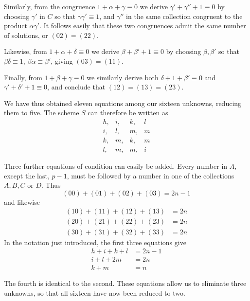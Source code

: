 Similarly, from the congruence $1+\alpha+\gamma\equiv0$ we derive $\gamma'+\gamma''+1\equiv0$ by choosing $\gamma'$ in $C$ so that $\gamma\gamma'\equiv1$, and $\gamma''$ in the same collection congruent to the product $\alpha\gamma'$. It follows easily that these two congruences admit the same number of solutions, or $(02)=(22)$.

Likewise, from $1+\alpha+\delta\equiv0$ we derive $\beta+\beta'+1\equiv0$ by choosing $\beta,\beta'$ so that $\beta\delta\equiv1$, $\beta\alpha\equiv\beta'$, giving $(03)=(11)$.

Finally, from $1+\beta+\gamma\equiv0$ we similarly derive both $\delta+1+\beta'\equiv0$ and $\gamma'+\delta'+1\equiv0$, and conclude that $(12)=(13)=(23)$.

We have thus obtained eleven equations among our sixteen unknowns, reducing them to five. The scheme $S$ can therefore be written as
\[
\begin{array}{llll}
h,&i,&k,&l\\
i,&l,&m,&m\\
k,&m,&k,&m\\
l,&m,&m,&i
\end{array}
\]

Three further equations of condition can easily be added. Every number in $A$, except the last, $p-1$, must be followed by a number in one of the collections $A,B,C$ or $D$. Thus
\[
(00)+(01)+(02)+(03)=2n-1
\]
and likewise
\[
\begin{aligned}
(10)+(11)+(12)+(13)&=2n\\
(20)+(21)+(22)+(23)&=2n\\
(30)+(31)+(32)+(33)&=2n
\end{aligned}
\]
In the notation just introduced, the first three equations give
\[
\begin{aligned}
h+i+k+l&=2n-1\\
i+l+2m&=2n\\
k+m&=n
\end{aligned}
\]

%
The fourth is identical to the second. These equations allow us to eliminate three unknowns, so that all sixteen have now been reduced to two.

